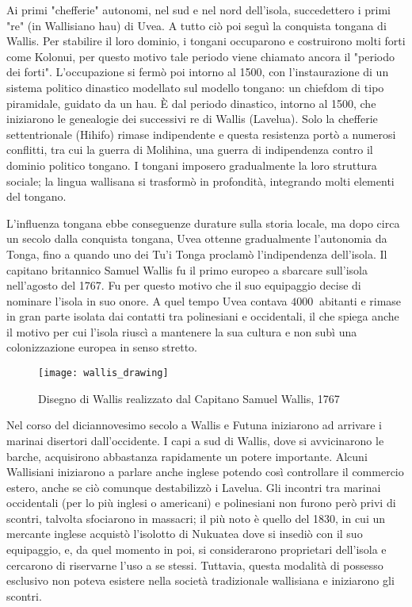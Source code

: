 \documentclass[fleqn,11pt]{SelfArx} %
\begin{document}
Ai primi "chefferie" autonomi, nel sud e nel nord dell'isola, succedettero i primi "re" (in Wallisiano hau) di Uvea.
A tutto ciò poi seguì la conquista tongana di Wallis. 
Per stabilire il loro dominio, i tongani occuparono e costruirono molti forti come Kolonui, per questo motivo tale periodo viene chiamato ancora il "periodo dei forti".
L'occupazione si fermò poi intorno al 1500, con l'instaurazione di un sistema politico dinastico modellato sul modello tongano: un chiefdom di tipo piramidale, guidato da un hau.
È dal periodo dinastico, intorno al 1500, che iniziarono le genealogie dei successivi re di Wallis (Lavelua).
Solo la chefferie settentrionale (Hihifo) rimase indipendente e questa resistenza portò a numerosi conflitti, tra cui la guerra di Molihina, una guerra di indipendenza contro il dominio politico tongano.
I tongani imposero gradualmente la loro struttura sociale; la lingua wallisana si trasformò in profondità, integrando molti elementi del tongano.

L'influenza tongana ebbe conseguenze durature sulla storia locale, ma dopo circa un secolo dalla conquista tongana, Uvea ottenne gradualmente l'autonomia da Tonga, fino a quando uno dei Tu'i Tonga proclamò l'indipendenza dell'isola.
Il capitano britannico Samuel Wallis fu il primo europeo a sbarcare sull'isola nell'agosto del 1767. 
Fu per questo motivo che il suo equipaggio decise di nominare l'isola in suo onore.
A quel tempo Uvea contava \(\SI{4000}{}\) abitanti e rimase in gran parte isolata dai contatti tra polinesiani e occidentali, il che spiega anche il motivo per cui l'isola riuscì a mantenere la sua cultura e non subì una colonizzazione europea in senso stretto.

\begin{figure}[ht]\centering
	\texttt{[image: wallis\_drawing]}
	\caption{Disegno di Wallis realizzato dal Capitano Samuel Wallis, 1767}
	\label{fig:wallis_drawing}
\end{figure}

Nel corso del diciannovesimo secolo a Wallis e Futuna iniziarono ad arrivare i marinai disertori dall'occidente.
I capi a sud di Wallis, dove si avvicinarono le barche, acquisirono abbastanza rapidamente un potere importante. Alcuni Wallisiani iniziarono a parlare anche inglese potendo così controllare il commercio estero, anche se ciò comunque destabilizzò i Lavelua.
Gli incontri tra marinai occidentali (per lo più inglesi o americani) e polinesiani non furono però privi di scontri, talvolta sfociarono in massacri; il più noto è quello del 1830, in cui un mercante inglese acquistò l'isolotto di Nukuatea dove si insediò con il suo equipaggio, e, da quel momento in poi, si considerarono proprietari dell'isola e cercarono di riservarne l'uso a se stessi.
Tuttavia, questa modalità di possesso esclusivo non poteva esistere nella società tradizionale wallisiana e iniziarono gli scontri.
\end{document}
